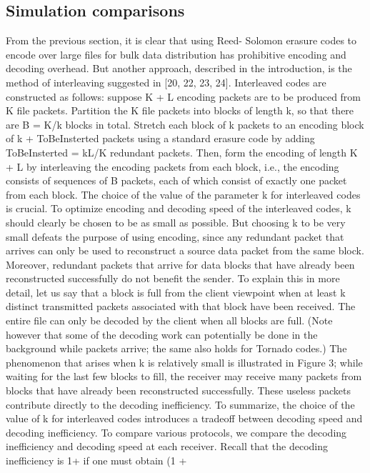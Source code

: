 \documentclass[12pt,a4paper,titlepage,twocolumn]{article}
\begin{document}
\subsection{Simulation comparisons}
From the previous section, it is clear that using Reed-
Solomon erasure codes to encode over large files for bulk
data distribution has prohibitive encoding and decoding
overhead. But another approach, described in the
introduction, is the method of interleaving suggested
in [20, 22, 23, 24]. Interleaved codes are constructed
as follows: suppose K + L encoding packets are to be
produced from K file packets. Partition the K file packets
into blocks of length k, so that there are B = K/k
blocks in total. Stretch each block of k packets to an encoding
block of k + ToBeInsterted packets using a standard erasure
code by adding ToBeInsterted = kL/K redundant packets. Then,
form the encoding of length K + L by interleaving the
encoding packets from each block, i.e., the encoding
consists of sequences of B packets, each of which consist
of exactly one packet from each block.
The choice of the value of the parameter k for interleaved
codes is crucial. To optimize encoding and decoding
speed of the interleaved codes, k should clearly
be chosen to be as small as possible. But choosing k
to be very small defeats the purpose of using encoding,
since any redundant packet that arrives can only
be used to reconstruct a source data packet from the
same block. Moreover, redundant packets that arrive
for data blocks that have already been reconstructed
successfully do not benefit the sender.
To explain this in more detail, let us say that a
block is full from the client viewpoint when at least k
distinct transmitted packets associated with that block
have been received. The entire file can only be decoded
by the client when all blocks are full. (Note however
that some of the decoding work can potentially be done
in the background while packets arrive; the same also
holds for Tornado codes.) The phenomenon that arises
when k is relatively small is illustrated in Figure 3; while
waiting for the last few blocks to fill, the receiver may receive
many packets from blocks that have already been
reconstructed successfully. These useless packets contribute
directly to the decoding inefficiency. To summarize,
the choice of the value of k for interleaved codes
introduces a tradeoff between decoding speed and decoding
inefficiency.
To compare various protocols, we compare the decoding
inefficiency and decoding speed at each receiver.
Recall that the decoding inefficiency is 1+
 if one must
obtain (1 +
\end{document}
